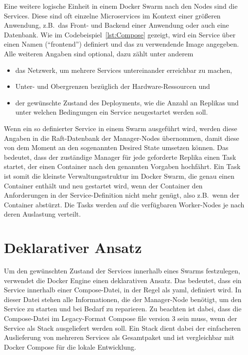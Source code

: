 Eine weitere logische Einheit in einem Docker Swarm nach den Nodes sind die Services. 
Diese sind oft einzelne Microservices im Kontext einer gr\"o{\ss}eren Anwendung, z.B.\ das Front- und Backend einer Anwendung oder auch eine Datenbank. 
Wie im Codebeispiel~\ref{lst:Compose} gezeigt, wird ein Service \"uber einen Namen (``frontend'') definiert und das zu verwendende Image angegeben. 
Alle weiteren Angaben sind optional, dazu z\"ahlt unter anderem
\begin{itemize}
    \item das Netzwerk, um mehrere Services untereinander erreichbar zu machen,
    \item Unter- und Obergrenzen bez\"uglich der Hardware-Ressourcen und 
    \item der gew\"unschte Zustand des Deployments, wie die Anzahl an Replikas und unter welchen Bedingungen ein Service neugestartet werden soll.
\end{itemize}

Wenn ein so definierter Service in einem Swarm ausgeführt wird, werden diese Angaben in die Raft-Datenbank der Manager-Nodes \"ubernommen, damit diese von dem Moment an den sogenannten Desired State umsetzen k\"onnen.
Das bedeutet, dass der zust\"andige Manager f\"ur jede geforderte Replika einen Task startet, der einen Container nach den genannten Vorgaben hochf\"ahrt. 
Ein Task ist somit die kleinste Verwaltungsstruktur im Docker Swarm, die genau einen Container enth\"alt und neu gestartet wird, wenn der Container den Anforderungen in der Service-Definition nicht mehr gen\"ugt, also z.B.\ wenn der Container abst\"urzt.
Die Tasks werden auf die verf\"ugbaren Worker-Nodes je nach deren Auslastung verteilt.\cite{Docker_Engine_Services}



\section{Deklarativer Ansatz}

Um den gew\"unschten Zustand der Services innerhalb eines Swarms festzulegen, verwendet die Docker Engine einen deklarativen Ansatz. 
Das bedeutet, dass ein Service innerhalb einer Compose-Datei, in der Regel als yaml, definiert wird. 
In dieser Datei stehen alle Informationen, die der Manager-Node ben\"otigt, um den Service zu starten und bei Bedarf zu reparieren. 
Zu beachten ist dabei, dass die Compose-Datei im Legacy-Format Compose file version 3 sein muss, wenn der Service als Stack ausgeliefert werden soll. 
Ein Stack dient dabei der einfacheren Auslieferung von mehreren Services als Gesamtpaket und ist vergleichbar mit Docker Compose f\"ur die lokale Entwicklung.\cite{Docker_Engine_deploy}